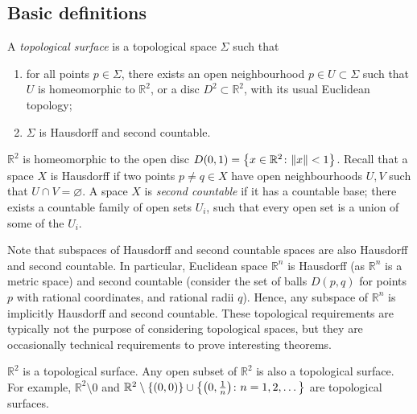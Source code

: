 \subsection{Basic definitions}
\begin{definition}
	A \textit{topological surface} is a topological space \( \Sigma \) such that
	\begin{enumerate}
		\item for all points \( p \in \Sigma \), there exists an open neighbourhood \( p \in U \subset \Sigma \) such that \( U \) is homeomorphic to \( \mathbb R^2 \), or a disc \( D^2 \subset \mathbb R^2 \), with its usual Euclidean topology;
		\item \( \Sigma \) is Hausdorff and second countable.
	\end{enumerate}
\end{definition}
\begin{remark}
	\( \mathbb R^2 \) is homeomorphic to the open disc \( D(0,1) = \qty{ x \in \mathbb R^2 \colon \norm{x} < 1 } \).
	Recall that a space \( X \) is Hausdorff if two points \( p \neq q \in X \) have open neighbourhoods \( U, V \) such that \( U \cap V = \varnothing \).
	A space \( X \) is \textit{second countable} if it has a countable base; there exists a countable family of open sets \( U_i \), such that every open set is a union of some of the \( U_i \).

	Note that subspaces of Hausdorff and second countable spaces are also Hausdorff and second countable.
	In particular, Euclidean space \( \mathbb R^n \) is Hausdorff (as \( \mathbb R^n \) is a metric space) and second countable (consider the set of balls \( D(p,q) \) for points \( p \) with rational coordinates, and rational radii \( q \)).
	Hence, any subspace of \( \mathbb R^n \) is implicitly Hausdorff and second countable.
	These topological requirements are typically not the purpose of considering topological spaces, but they are occasionally technical requirements to prove interesting theorems.
\end{remark}
\begin{example}
	\( \mathbb R^2 \) is a topological surface.
	Any open subset of \( \mathbb R^2 \) is also a topological surface.
	For example, \( \mathbb R^2 \setminus \qty{0} \) and \( \mathbb R^2 \setminus \qty{(0,0)} \cup \qty{\qty(0, \frac{1}{n}) \colon n = 1, 2, \dots} \) are topological surfaces.
\end{example}
